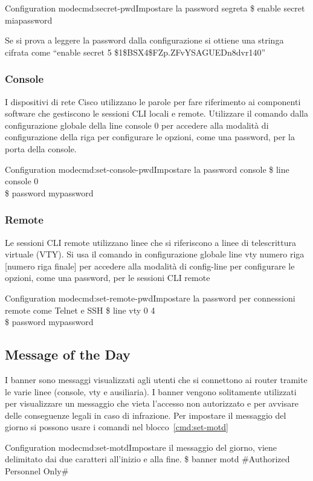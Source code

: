 \begin{cmds}{Configuration mode}{cmd:secret-pwd}{Impostare la \textcolor{Highlight1}{password} segreta}
    \$ enable secret \textcolor{Highlight1}{miapassword}
\end{cmds}

Se si prova a leggere la password dalla configurazione si ottiene una stringa cifrata come ``enable secret 5 \$1\$BSX4\$FZp.ZFvYSAGUEDn8dvr140''

\subsubsection{Console}
I dispositivi di rete Cisco utilizzano le parole per fare riferimento ai componenti software che gestiscono le sessioni CLI locali e remote. Utilizzare il comando dalla configurazione globale della line console 0 per accedere alla modalità di configurazione della riga per configurare le opzioni, come una password, per la porta della console.

\begin{cmds}{Configuration mode}{cmd:set-console-pwd}{Impostare la password console}
    \$ line console 0\\
    \$ password \textcolor{Highlight1}{mypassword}
\end{cmds}

\subsubsection{Remote}
Le sessioni CLI remote utilizzano linee che si riferiscono a linee di telescrittura virtuale (VTY). Si usa il comando in configurazione globale line vty numero riga [numero riga finale] per accedere alla modalità di config-line per configurare le opzioni, come una password, per le sessioni CLI remote

\begin{cmds}{Configuration mode}{cmd:set-remote-pwd}{Impostare la password per connessioni remote come Telnet e SSH}
    \$ line vty 0 4\\
    \$ password \textcolor{Highlight1}{mypassword}
\end{cmds}

\subsection{Message of the Day}
I banner sono messaggi visualizzati agli utenti che si connettono ai router tramite le varie linee (console, vty e ausiliaria). I banner vengono solitamente utilizzati per visualizzare un messaggio che vieta l’accesso non autorizzato e per avvisare delle conseguenze legali in caso di infrazione. Per impostare il messaggio del giorno si possono usare i comandi nel blocco~\ref{cmd:set-motd}

\begin{cmds}{Configuration mode}{cmd:set-motd}{Impostare il messaggio del giorno, viene delimitato dai due \textcolor{Highlight2}{caratteri} all'inizio e alla fine.}
    \$ banner motd \#Authorized Personnel Only\#
\end{cmds}


